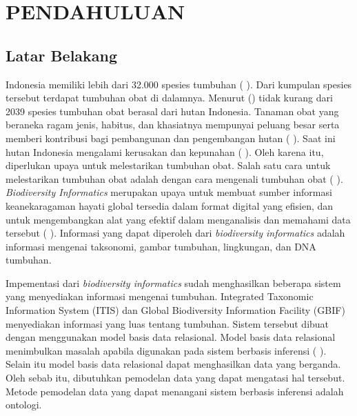 \section*{PENDAHULUAN} %
\subsection*{Latar Belakang}
Indonesia memiliki lebih dari 32.000 spesies tumbuhan (\citeauthor{BAPPENAS2003} \cite*{BAPPENAS2003}). Dari kumpulan spesies tersebut terdapat tumbuhan obat di dalamnya. Menurut \citeauthor{ZUHUD2008} (\cite*{ZUHUD2008}) tidak kurang dari 2039 spesies tumbuhan obat berasal dari hutan Indonesia. Tanaman obat yang beraneka ragam jenis, habitus, dan khasiatnya mempunyai peluang besar serta memberi kontribusi bagi pembangunan dan pengembangan hutan (\citeauthor{HAMZARI2008} \cite*{HAMZARI2008}). Saat ini hutan Indonesia mengalami kerusakan dan kepunahan (\citeauthor{ZUHUD2008} \cite*{ZUHUD2008}). Oleh karena itu, diperlukan upaya untuk melestarikan tumbuhan obat. Salah satu cara untuk melestarikan tumbuhan obat adalah dengan cara mengenali tumbuhan obat (\citeauthor{HAMZARI2008} \cite*{HAMZARI2008}). \textit{Biodiversity Informatics} merupakan upaya untuk membuat sumber informasi keanekaragaman hayati global tersedia dalam format digital yang efisien, dan untuk mengembangkan alat yang efektif dalam menganalisis dan memahami data tersebut (\citeauthor{GILLMANE2009} \cite*{GILLMANE2009}). Informasi yang dapat diperoleh dari \textit{biodiversity informatics} adalah informasi mengenai taksonomi, gambar tumbuhan, lingkungan, dan DNA tumbuhan. 

Impementasi dari \textit{biodiversity informatics} sudah menghasilkan beberapa sistem yang menyediakan informasi mengenai tumbuhan.  Integrated Taxonomic Information System  (ITIS) dan Global Biodiversity Information Facility (GBIF) menyediakan informasi yang luas tentang tumbuhan. Sistem tersebut dibuat dengan menggunakan model basis data relasional. Model basis data relasional menimbulkan masalah apabila digunakan pada sistem berbasis inferensi (\citeauthor{LAALLAM2013} \cite*{LAALLAM2013}). Selain itu model basis data relasional dapat menghasilkan data yang berganda. Oleh sebab itu, dibutuhkan pemodelan data yang dapat mengatasi hal tersebut. Metode pemodelan data yang dapat menangani sistem berbasis inferensi adalah ontologi.

